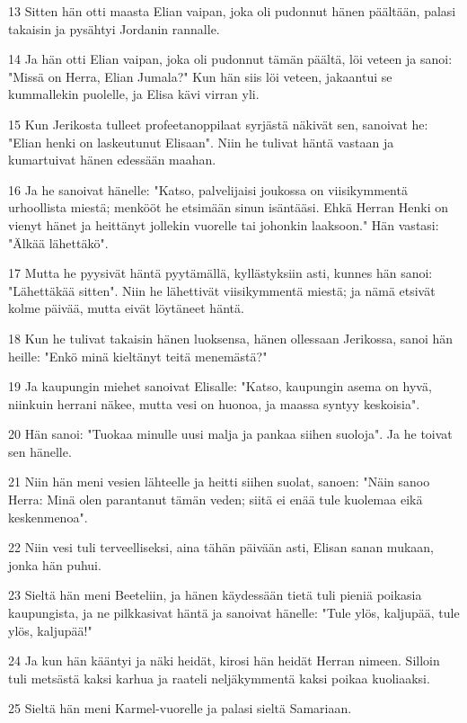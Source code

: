 \par 13 Sitten hän otti maasta Elian vaipan, joka oli pudonnut hänen päältään, palasi takaisin ja pysähtyi Jordanin rannalle.
\par 14 Ja hän otti Elian vaipan, joka oli pudonnut tämän päältä, löi veteen ja sanoi: "Missä on Herra, Elian Jumala?" Kun hän siis löi veteen, jakaantui se kummallekin puolelle, ja Elisa kävi virran yli.
\par 15 Kun Jerikosta tulleet profeetanoppilaat syrjästä näkivät sen, sanoivat he: "Elian henki on laskeutunut Elisaan". Niin he tulivat häntä vastaan ja kumartuivat hänen edessään maahan.
\par 16 Ja he sanoivat hänelle: "Katso, palvelijaisi joukossa on viisikymmentä urhoollista miestä; menkööt he etsimään sinun isäntääsi. Ehkä Herran Henki on vienyt hänet ja heittänyt jollekin vuorelle tai johonkin laaksoon." Hän vastasi: "Älkää lähettäkö".
\par 17 Mutta he pyysivät häntä pyytämällä, kyllästyksiin asti, kunnes hän sanoi: "Lähettäkää sitten". Niin he lähettivät viisikymmentä miestä; ja nämä etsivät kolme päivää, mutta eivät löytäneet häntä.
\par 18 Kun he tulivat takaisin hänen luoksensa, hänen ollessaan Jerikossa, sanoi hän heille: "Enkö minä kieltänyt teitä menemästä?"
\par 19 Ja kaupungin miehet sanoivat Elisalle: "Katso, kaupungin asema on hyvä, niinkuin herrani näkee, mutta vesi on huonoa, ja maassa syntyy keskoisia".
\par 20 Hän sanoi: "Tuokaa minulle uusi malja ja pankaa siihen suoloja". Ja he toivat sen hänelle.
\par 21 Niin hän meni vesien lähteelle ja heitti siihen suolat, sanoen: "Näin sanoo Herra: Minä olen parantanut tämän veden; siitä ei enää tule kuolemaa eikä keskenmenoa".
\par 22 Niin vesi tuli terveelliseksi, aina tähän päivään asti, Elisan sanan mukaan, jonka hän puhui.
\par 23 Sieltä hän meni Beeteliin, ja hänen käydessään tietä tuli pieniä poikasia kaupungista, ja ne pilkkasivat häntä ja sanoivat hänelle: "Tule ylös, kaljupää, tule ylös, kaljupää!"
\par 24 Ja kun hän kääntyi ja näki heidät, kirosi hän heidät Herran nimeen. Silloin tuli metsästä kaksi karhua ja raateli neljäkymmentä kaksi poikaa kuoliaaksi.
\par 25 Sieltä hän meni Karmel-vuorelle ja palasi sieltä Samariaan.

